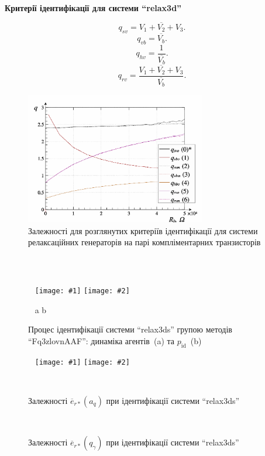 \documentclass[14pt,handout,utf8]{beamer}
\newlength\DDP
\newcommand{\Xhead}[1]{
 \begin{center}%
      \textbf{#1}%
 \end{center}%
}
\newcommand{\ABlbl}{%
  \vspace{-2.7ex}
  \begin{center}
    ~ \hfill a \hfill\hfill b \hfill ~
  \end{center}
  \vspace{-2.0ex}
}
\newcommand{\PicDouble}[2]{%
 \begin{center}
    ~ \hfill
    \texttt{[image: \#1]}
    \hfill
    \texttt{[image: \#2]}
    \hfill ~
  \end{center}
  \ABlbl
}
\newcommand{\PicDoubleNL}[2]{%
 \begin{center}
    ~ \hfill
    \texttt{[image: \#1]}
    \hfill
    \texttt{[image: \#2]}
    \hfill ~
  \end{center}
}
\newcommand{\TextDouble}[2]{%
 \begin{center}
    ~ \hfill
    \parbox[t]{\DDP}{#1}
    \hfill
    \parbox[t]{\DDP}{#2}
    \hfill ~
  \end{center}
}
\begin{document}
\begin{frame}
  \frametitle{~}

  \Xhead{Критерії ідентифікації для системи ``relax3d''}

\begin{equation}
  q_{sv} = \overline{V_1+V_2+V_3} .
  \label{atu:eq:q_sv_relax}
\end{equation}
%
\begin{equation}
  q_{vb} = \overline{V_b} .
  \label{atu:eq:q_vb_relax}
\end{equation}
%
\begin{equation}
  q_{hv} = \frac{1}{\overline{V_b}} .
  \label{atu:eq:q_hb_relax}
\end{equation}
%
\begin{equation}
  q_{rv} = \frac{\overline{V_1+V_2+V_3}}{\overline{V_b}}.
  \label{atu:eq:q_rv_relax}
\end{equation}

  \begin{figure}
    \includegraphics[width=0.7\textwidth]{../p7/p/relax3d_read_q-p_q1.png}
    \caption{Залежності для розглянутих критеріїв ідентифікації для системи релаксаційних генераторів на парі компліментарних транзисторів}
  \end{figure}


\end{frame}



\begin{frame}
  \frametitle{~}

  \Xhead{}

  \begin{figure}
    \PicDouble{../p7/p/relax3ds_read_id2_0-p_p.png}{../p7/p/relax3ds_read_id2_0-p_pp.png}
    \caption{Процес ідентифікації системи ``relax3ds'' групою методів ``Fq3zlovnAAF'': динаміка агентів~(a) та $p_\mathrm{id}$~(b)}
  \end{figure}

  \begin{figure}
    \PicDoubleNL{../p7/p/relax3ds_read_id2_prm_0-p_a_q.png}{../p7/p/relax3ds_read_id2_prm_0-p_q_gamma.png}
    \TextDouble{\caption{Залежності $\overline{e}_{r *}(a_q)$ при ідентифікації системи ``relax3ds''}}{\caption{Залежності $ \overline{e}_{r *} (q_\gamma) $ при ідентифікації системи ``relax3ds''}}
  \end{figure}


\end{frame}
\end{document}
